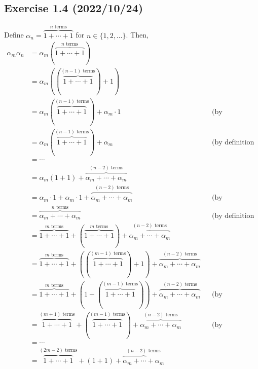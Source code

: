 \documentclass{article}
\begin{document}
\let\rem\undefined
\let\Zm\undefined

\subsection{Exercise 1.4 (2022/10/24)}
\newcommand\F{\mathfrak F}
Define $\alpha_n = \overbrace{1 + \cdots + 1}^\text{$n$ terms}$ for $n \in \{1, 2, \ldots\}$.
Then, \begin{align*}
  \alpha_m\alpha_n
  &= \alpha_m(\overbrace{1 + \dotsb + 1}^\text{$n$ terms}) \\
  &= \alpha_m((\overbrace{1+ \dotsb + 1}^\text{$(n-1)$ terms}) + 1)\\
  &= \alpha_m(\overbrace{1 + \dotsb + 1}^\text{$(n-1)$ terms}) + \alpha_m \cdot 1 && \text{(by distributive law)}\\
  &= \alpha_m(\overbrace{1 + \dotsb + 1}^\text{$(n-1)$ terms}) + \alpha_m && \text{(by definition of multiplicative identity)}\\
  &= \dotsb \\
  &= \alpha_m(1 + 1) + \overbrace{\alpha_m + \dotsb + \alpha_m}^\text{$(n-2)$ terms}\\
  &= \alpha_m \cdot 1 + \alpha_m \cdot 1 + \overbrace{\alpha_m + \dotsb + \alpha_m}^\text{$(n-2)$ terms} && \text{(by distributive law)} \\
  &= \overbrace{\alpha_m + \dotsb + \alpha_m}^\text{$n$ terms} && \text{(by definition of multiplicative identity)} \\
  &= \overbrace{1 + \dotsb + 1}^\text{$m$ terms} + (\overbrace{1 + \dotsb + 1}^\text{$m$ terms}) + \overbrace{\alpha_m + \dotsb + \alpha_m}^\text{$(n-2)$ terms} \\
  &= \overbrace{1 + \dotsb + 1}^\text{$m$ terms} + ((\overbrace{1 + \dotsb + 1}^\text{$(m-1)$ terms}) + 1) + \overbrace{\alpha_m + \dotsb + \alpha_m}^\text{$(n-2)$ terms} \\
  &= \overbrace{1 + \dotsb + 1}^\text{$m$ terms} + (1 + (\overbrace{1 + \dotsb + 1}^\text{$(m-1)$ terms})) + \overbrace{\alpha_m + \dotsb + \alpha_m}^\text{$(n-2)$ terms} && \text{(by commutative property)}\\
  &= \overbrace{1 + \dotsb + 1}^\text{$(m+1)$ terms} + (\overbrace{1 + \dotsb + 1}^\text{$(m-1)$ terms}) + \overbrace{\alpha_m + \dotsb + \alpha_m}^\text{$(n-2)$ terms} && \text{(by associative property)}  \\
  &= \dotsb \\
  &= \overbrace{1 + \dotsb + 1}^\text{$(2m-2)$ terms} + (1 + 1) + \overbrace{\alpha_m + \dotsb + \alpha_m}^\text{$(n-2)$ terms} \\

\end{align*}
\end{document}

